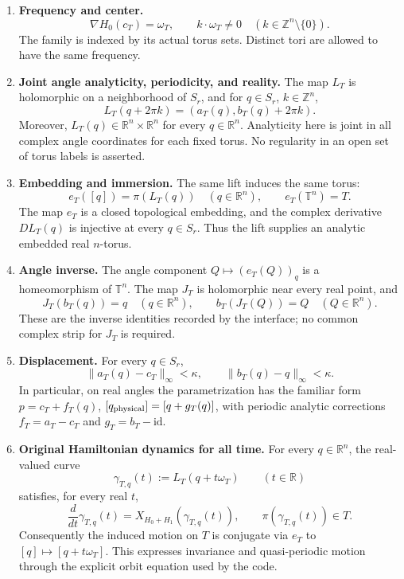 \documentclass[11pt,a4paper]{article}
\newcommand{\R}{\mathbb R}
\newcommand{\Z}{\mathbb Z}
\newcommand{\T}{\mathbb T}
\newcommand{\norm}[1]{\lVert #1\rVert}
\begin{document}
\begin{enumerate}[label=\textup{(T\arabic*)}]
\item \textbf{Frequency and center.}
\[
 \nabla H_0(c_T)=\omega_T,\qquad
 k\cdot\omega_T\ne0\quad(k\in\Z^n\setminus\{0\}).
\]
The family is indexed by its actual torus sets. Distinct tori are allowed
to have the same frequency.

\item \textbf{Joint angle analyticity, periodicity, and reality.}
The map \(L_T\) is holomorphic on a neighborhood of \(S_r\), and for
\(q\in S_r\), \(k\in\Z^n\),
\[
 L_T(q+2\pi k)=(a_T(q),b_T(q)+2\pi k).
\]
Moreover, \(L_T(q)\in\R^n\times\R^n\) for every \(q\in\R^n\).
Analyticity here is joint in all complex angle coordinates for each fixed
torus. No regularity in an open set of torus labels is asserted.

\item \textbf{Embedding and immersion.} The same lift induces the same torus:
\[
 e_T([q])=\pi(L_T(q))\quad(q\in\R^n),\qquad
 e_T(\T^n)=T.
\]
The map \(e_T\) is a closed topological embedding, and the complex
derivative \(DL_T(q)\) is injective at every \(q\in S_r\).
Thus the lift supplies an analytic embedded real \(n\)-torus.

\item \textbf{Angle inverse.} The angle component
\(Q\mapsto(e_T(Q))_q\) is a homeomorphism of \(\T^n\).
The map \(J_T\) is holomorphic near every real point, and
\[
 J_T(b_T(q))=q\quad(q\in\R^n),\qquad
 b_T(J_T(Q))=Q\quad(Q\in\R^n).
\]
These are the inverse identities recorded by the interface; no common
complex strip for \(J_T\) is required.

\item \textbf{Displacement.} For every \(q\in S_r\),
\[
 \norm{a_T(q)-c_T}_\infty<\kappa,\qquad
 \norm{b_T(q)-q}_\infty<\kappa.
\]
In particular, on real angles the parametrization has the familiar form
\(p=c_T+f_T(q)\), \([q_{\rm physical}]=[q+g_T(q)]\), with periodic
analytic corrections \(f_T=a_T-c_T\) and \(g_T=b_T-\mathrm{id}\).

\item \textbf{Original Hamiltonian dynamics for all time.} For every
\(q\in\R^n\), the real-valued curve
\[
 \gamma_{T,q}(t):=L_T(q+t\omega_T)\qquad(t\in\R)
\]
satisfies, for every real \(t\),
\[
 \frac{d}{dt}\gamma_{T,q}(t)=X_{H_0+H_1}(\gamma_{T,q}(t)),\qquad
 \pi(\gamma_{T,q}(t))\in T.
\]
Consequently the induced motion on \(T\) is conjugate via \(e_T\) to
\([q]\mapsto[q+t\omega_T]\). This expresses invariance and quasi-periodic
motion through the explicit orbit equation used by the code.
\end{enumerate}
\end{document}
